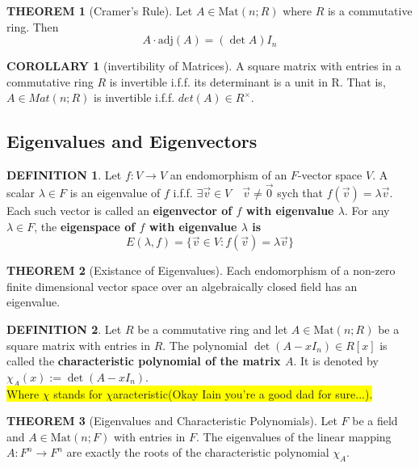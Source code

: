 \documentclass[12pt]{article}
\theoremstyle{definition}
\newtheorem{definition}{DEFINITION}[subsection]
\newtheorem{theorem}{THEOREM}[subsection]
\newcommand{\Mat}{\text{Mat}}
\newcommand{\adj}{\text{adj}}
\newtheorem{corollary}{COROLLARY}[subsection]
\begin{document}
\begin{theorem}[Cramer's Rule]
    Let $A \in \Mat(n;R)$ where $R$ is a commutative ring. Then
    $$A\cdot \adj(A) = (\det A)I_n$$
\end{theorem}

\begin{corollary}[invertibility of Matrices]
    A square matrix with entries in a commutative ring $R$ is invertible i.f.f. its determinant is a unit in R. That is, $A \in Mat(n; R)$ is invertible i.f.f. $det(A) \in R^\times$.
\end{corollary}

\subsection{Eigenvalues and Eigenvectors}
\begin{definition}
    Let $f:V \rightarrow V$ an endomorphism of an $F$-vector space $V$. A scalar $\lambda \in F$ is an eigenvalue of $f$ i.f.f. $\exists \vec{v} \in V \quad \vec{v} \neq \vec{0}$ sych that $f(\vec{v}) = \lambda\vec{v}$. Each such vector is called an \textbf{eigenvector of $f$ with eigenvalue $\lambda$}. For any $\lambda \in F$, the \textbf{eigenspace of $f$ with eigenvalue $\lambda$ is}    $$E(\lambda,f) = \{\vec{v}\in V:f(\vec{v}) = \lambda\vec{v}\}$$
\end{definition}

\begin{theorem}[Existance of Eigenvalues]
    Each endomorphism of a non-zero finite dimensional vector space over an algebraically closed field has an eigenvalue.
\end{theorem}

\begin{definition}
    Let $R$ be a commutative ring and let $A \in \Mat(n;R)$ be a square matrix with entries in $R$. The polynomial $\det(A-xI_n) \in R[x]$ is called the \textbf{characteristic polynomial of the matrix $A$}. It is denoted by $\chi_A(x):= \det(A-xI_n)$.\\\colorbox{yellow}{Where $\chi$ stands for $\chi$aracteristic\tiny{(Okay Iain you're a good dad for sure...)}.}
\end{definition}

\begin{theorem}[Eigenvalues and Characteristic Polynomials]
    Let $F$ be a field and $A \in \Mat(n;F)$ with entries in $F$. The eigenvalues of the linear mapping $A:F^n \rightarrow F^n$ are exactly the roots of the characteristic polynomial $\chi_A$.
\end{theorem}
\end{document}
